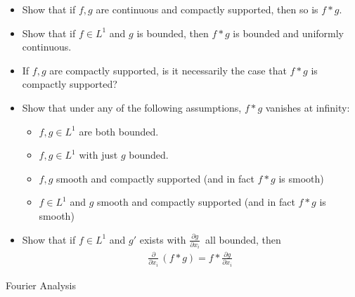 \begin{itemize}
\tightlist
\item
  Show that if \(f, g\) are continuous and compactly supported, then so
  is \(f\ast g\).
\item
  Show that if \(f\in L^1\) and \(g\) is bounded, then \(f\ast g\) is
  bounded and uniformly continuous.
\item
  If \(f, g\) are compactly supported, is it necessarily the case that
  \(f\ast g\) is compactly supported?
\item
  Show that under any of the following assumptions, \(f\ast g\) vanishes
  at infinity:

  \begin{itemize}
  \tightlist
  \item
    \(f, g\in L^1\) are both bounded.
  \item
    \(f, g\in L^1\) with just \(g\) bounded.
  \item
    \(f, g\) smooth and compactly supported (and in fact \(f\ast g\) is
    smooth)
  \item
    \(f\in L^1\) and \(g\) smooth and compactly supported (and in fact
    \(f\ast g\) is smooth)
  \end{itemize}
\item
  Show that if \(f\in L^1\) and \(g'\) exists with
  \({\frac{\partial g}{\partial x_i}\,}\) all bounded, then
  \begin{align*}{\frac{\partial }{\partial x_i}\,}(f\ast g) = f \ast {\frac{\partial g}{\partial x_i}\,}\end{align*}
\end{itemize}

Fourier Analysis

